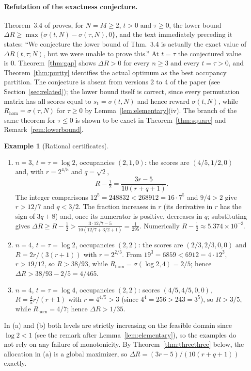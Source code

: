 \documentclass[11pt]{article}
\theoremstyle{plain}
\theoremstyle{definition}
\newtheorem{example}[theorem]{Example}
\theoremstyle{remark}
\newcommand{\Rhom}{R_{\mathrm{hom}}}
\newcommand{\sig}{\sigma}
\begin{document}
\paragraph{Refutation of the exactness conjecture.} Theorem~3.4 of \cite{ABPv1} proves, for $N=M\ge2$, $t>0$ and $\tau\ge0$, the lower bound $\Delta R\ge\max\{\sig(t,N)-\sig(\tau,N),0\}$, and the text immediately preceding it states: ``We conjecture the lower bound of Thm.~3.4 is actually the exact value of $\Delta R(t,\tau;N)$, but we were unable to prove this.'' At $t=\tau$ the conjectured value is $0$. Theorem~\ref{thm:gap} shows $\Delta R>0$ for every $n\ge3$ and every $t=\tau>0$, and Theorem~\ref{thm:purity} identifies the actual optimum as the best occupancy partition. The conjecture is absent from versions 2 to 4 of the paper (see Section~\ref{sec:related}); the lower bound itself is correct, since every permutation matrix has all scores equal to $s_1=\sig(t,N)$ and hence reward $\sig(t,N)$, while $\Rhom=\sig(\tau,N)$ for $\tau\ge0$ by Lemma~\ref{lem:elementary}(iv). The branch of the same theorem for $\tau\le0$ is shown to be exact in Theorem~\ref{thm:square} and Remark~\ref{rem:lowerbound}.

\begin{example}[Rational certificates]\label{ex:certificates}
\begin{enumerate}[nosep,label=(\alph*)]
\item $n=3$, $t=\tau=\log2$, occupancies $(2,1,0)$: the scores are $(4/5,1/2,0)$ and, with $r=2^{4/5}$ and $q=\sqrt2$,
\[
 R-\tfrac12=\frac{3r-5}{10(r+q+1)} .
\]
The integer comparisons $12^5=248832<268912=16\cdot7^5$ and $9/4>2$ give $r>12/7$ and $q<3/2$. The fraction increases in $r$ (its derivative in $r$ has the sign of $3q+8$) and, once its numerator is positive, decreases in $q$; substituting gives $\Delta R\ge R-\frac12>\frac{3\cdot12/7-5}{10(12/7+3/2+1)}=\frac1{295}$. Numerically $R-\frac12\approx5.374\times10^{-3}$.
\item $n=4$, $t=\tau=\log2$, occupancies $(2,2)$: the scores are $(2/3,2/3,0,0)$ and $R=2r/(3(r+1))$ with $r=2^{2/3}$. From $19^3=6859<6912=4\cdot12^3$, $r>19/12$, so $R>38/93$, while $\Rhom=\sig(\log2,4)=2/5$; hence $\Delta R>38/93-2/5=4/465$.
\item $n=4$, $t=\tau=\log4$, occupancies $(2,2)$: scores $(4/5,4/5,0,0)$, $R=\frac45r/(r+1)$ with $r=4^{4/5}>3$ (since $4^4=256>243=3^5$), so $R>3/5$, while $\Rhom=4/7$; hence $\Delta R>1/35$.
\end{enumerate}
In (a) and (b) both levels are strictly increasing on the feasible domain since $\log2<1$ (see the remark after Lemma~\ref{lem:elementary}), so the examples do not rely on any failure of monotonicity. By Theorem~\ref{thm:threethree} below, the allocation in (a) is a global maximizer, so $\Delta R=(3r-5)/(10(r+q+1))$ exactly.
\end{example}
\end{document}
